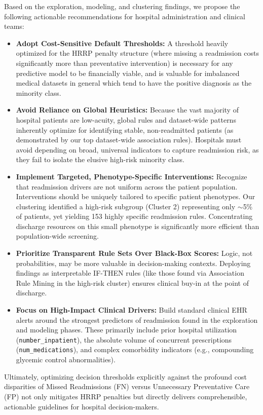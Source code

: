 \documentclass[journal,onecolumn]{IEEEtran}
\begin{document}
Based on the exploration, modeling, and clustering findings, we propose the following actionable recommendations for hospital administration and clinical teams:
\begin{itemize}
    \item \textbf{Adopt Cost-Sensitive Default Thresholds:} A threshold heavily optimized for the HRRP penalty structure (where missing a readmission costs significantly more than preventative intervention) is necessary for any predictive model to be financially viable, and is valuable for imbalanced medical datasets in general which tend to have the positive diagnosis as the minority class.
    \item \textbf{Avoid Reliance on Global Heuristics:} Because the vast majority of hospital patients are low-acuity, global rules and dataset-wide patterns inherently optimize for identifying stable, non-readmitted patients (as demonstrated by our top dataset-wide association rules). Hospitals must avoid depending on broad, universal indicators to capture readmission risk, as they fail to isolate the elusive high-risk minority class.
    \item \textbf{Implement Targeted, Phenotype-Specific Interventions:} Recognize that readmission drivers are not uniform across the patient population. Interventions should be uniquely tailored to specific patient phenotypes. Our clustering identified a high-risk subgroup (Cluster 2) representing only $\sim$5\% of patients, yet yielding 153 highly specific readmission rules. Concentrating discharge resources on this small phenotype is significantly more efficient than population-wide screening.
    \item \textbf{Prioritize Transparent Rule Sets Over Black-Box Scores:} Logic, not probabilities, may be more valuable in decision-making contexts. Deploying findings as interpretable IF-THEN rules (like those found via Association Rule Mining in the high-risk cluster) ensures clinical buy-in at the point of discharge.
    \item \textbf{Focus on High-Impact Clinical Drivers:} Build standard clinical EHR alerts around the strongest predictors of readmission found in the exploration and modeling phases. These primarily include prior hospital utilization (\texttt{number\_inpatient}), the absolute volume of concurrent prescriptions (\texttt{num\_medications}), and complex comorbidity indicators (e.g., compounding glycemic control abnormalities).
\end{itemize}

Ultimately, optimizing decision thresholds explicitly against the profound cost disparities of Missed Readmissions (FN) versus Unnecessary Preventative Care (FP) not only mitigates HRRP penalties but directly delivers comprehensible, actionable guidelines for hospital decision-makers.



\end{document}
